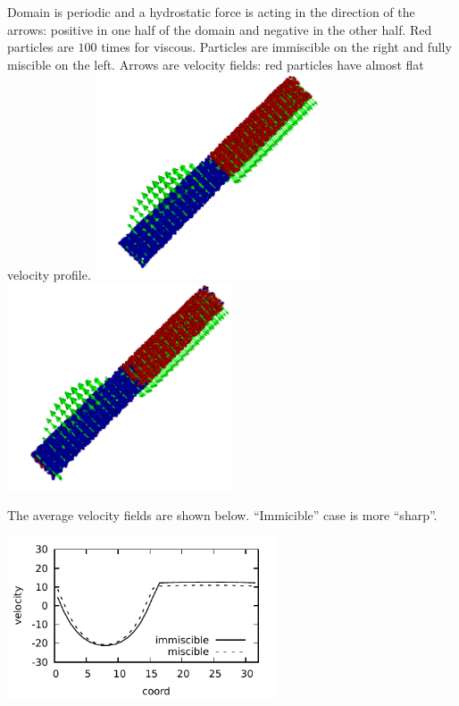 Domain is periodic and a hydrostatic force is acting in the direction of the arrows:
positive in one half of the domain and negative in the other half.  Red
particles are $100$ times for viscous. Particles are immiscible on the
right and fully miscible on the left. Arrows are velocity fields: red
particles have almost flat velocity profile.
\includegraphics[width=0.5\textwidth]{i/flow/a/visit.png}
\includegraphics[width=0.5\textwidth]{i/flow/b/visit.png}


The average velocity fields are shown below. ``Immicible'' case is
more ``sharp''.

\begin{center}
\includegraphics[width=0.6\textwidth]{i/flow/prof.pdf}
\end{center}

